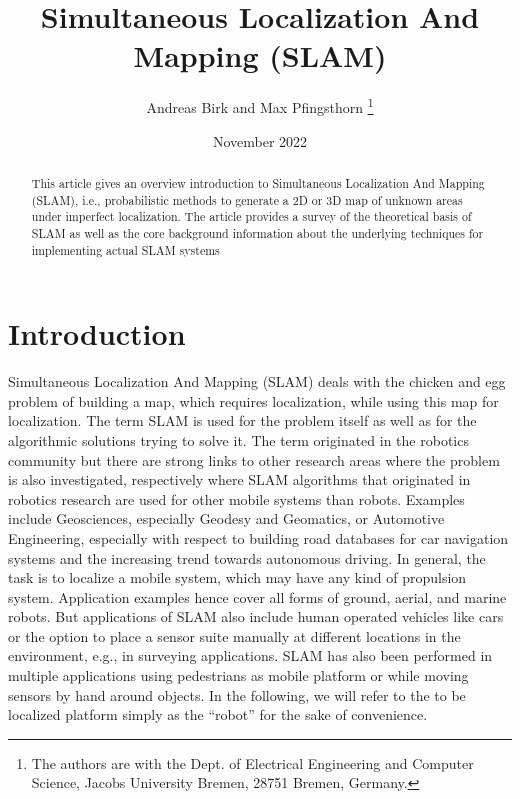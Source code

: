 \documentclass[english]{article}
\begin{document}
\title{Simultaneous Localization And Mapping (SLAM)}

\author{
Andreas Birk and Max Pfingsthorn
\thanks{The authors are with the Dept. of Electrical Engineering and
Computer Science, Jacobs University Bremen, 28751 Bremen, Germany.}
}
\date{November 2022}
\maketitle

\begin{abstract}
    This article gives an overview introduction to Simultaneous Localization
    And Mapping (SLAM), i.e., probabilistic methods to generate a 2D or 3D map
    of unknown areas under imperfect localization. The article provides a
    survey of the theoretical basis of SLAM as well as the core background
    information about the underlying techniques
    for implementing actual SLAM systems
\end{abstract}

\section{\label{sec:Intro}Introduction}Simultaneous
Localization And
Mapping (SLAM) deals with the chicken and egg problem of building a map,
which
requires localization, while using this map for localization. The term SLAM
is used for the problem itself as well
as for the algorithmic solutions trying to solve it. The term originated in
the robotics community but there are
strong links to other research areas where the problem is also
investigated, respectively where SLAM algorithms
that originated in robotics research are used for other mobile systems than
robots. Examples include Geosciences,
especially Geodesy and Geomatics, or Automotive Engineering, especially 
with respect to building road databases
for car navigation systems and the increasing trend towards autonomous
driving. In general, the task is to localize
a mobile system, which may have any kind of propulsion system. Application
examples hence cover all forms of
ground, aerial, and marine robots. But applications of SLAM also include
human operated vehicles like cars or the
option to place a sensor suite manually at different locations in the 
environment, e.g., in surveying applications.
SLAM has also been performed in multiple applications using pedestrians as
mobile platform or while moving
sensors by hand around objects. In the following, we will refer to the to 
be localized platform simply as the “robot”
for the sake of convenience.
\end{document}
